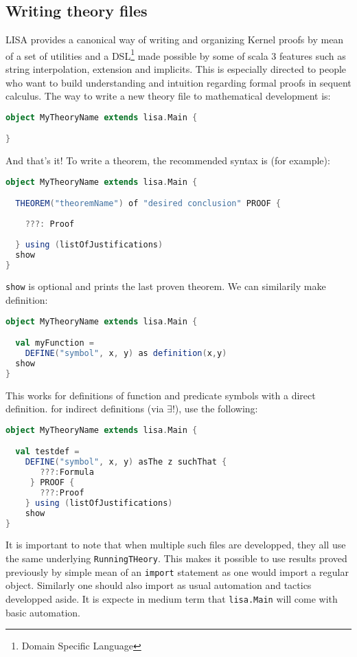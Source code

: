 \subsection{Writing theory files}
LISA provides a canonical way of writing and organizing Kernel proofs by mean of a set of utilities and a DSL\footnote{Domain Specific Language} made possible by some of scala 3 features such as string interpolation, extension and implicits. This is especially directed to people who want to build understanding and intuition regarding formal proofs in sequent calculus.
The way to write a new theory file to mathematical development is:
\begin{lstlisting}[language=Scala, frame=single]
object MyTheoryName extends lisa.Main {

}
\end{lstlisting}
And that's it! To write a theorem, the recommended syntax is (for example):

\begin{lstlisting}[language=Scala, frame=single]
object MyTheoryName extends lisa.Main {

  THEOREM("theoremName") of "desired conclusion" PROOF {
    
    ???: Proof
    
  } using (listOfJustifications)
  show
}
\end{lstlisting}
\lstinline{show}{} is optional and prints the last proven theorem. We can similarily make definition:
\begin{lstlisting}[language=Scala, frame=single]
object MyTheoryName extends lisa.Main {

  val myFunction = 
    DEFINE("symbol", x, y) as definition(x,y)
  show
}
\end{lstlisting}
This works for definitions of function and predicate symbols with a direct definition. for indirect definitions (via $\exists !$), use the following:
\begin{lstlisting}[language=Scala, frame=single]
object MyTheoryName extends lisa.Main {

  val testdef =
    DEFINE("symbol", x, y) asThe z suchThat {
       ???:Formula
     } PROOF {
       ???:Proof
    } using (listOfJustifications)
    show
}
\end{lstlisting}

It is important to note that when multiple such files are developped, they all use the same underlying \lstinline{RunningTHeory}{}. This makes it possible to use results proved previously by simple mean of an \lstinline{import}{} statement as one would import a regular object. Similarly one should also import as usual automation and tactics developped aside. It is expecte in medium term that \lstinline{lisa.Main} will come with basic automation.

